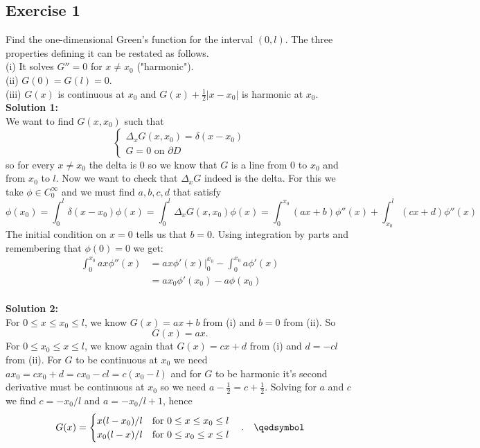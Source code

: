 \documentclass[12pt]{article}%
\begin{document}
\subsection*{Exercise 1}
Find the one-dimensional Green's function for the interval $(0,l)$. The three
properties defining it can be restated as follows.\\
(i) It solves $G''=0$ for $x\neq x_0$ ("harmonic").\\
(ii) $G(0)=G(l)=0$.\\
(iii) $G(x)$ is continuous at $x_0$ and $G(x)+\frac{1}{2}|x-x_0|$ is harmonic at $x_0$.\\
\textbf{Solution 1:}\\
We want to find $G(x,x_0)$ such that
\[
    \begin{cases}
       \Delta_x G(x,x_0)=\delta(x-x_0)\\
       G=0 \text{ on } \partial D
    \end{cases}
\]
so for every $x\neq x_0$ the delta is 0 so we know that $G$ is a line from 0 to
$x_0$ and from $x_0$ to $l$. Now we want to check that $\Delta_x G$ indeed is the
delta. For this we take $\phi \in C_0^\infty$ and we must find $a,b,c,d$ that
satisfy
\[
    \phi(x_0)=\int_0^l \delta(x-x_0)\phi(x)=\int_0^l \Delta_xG(x,x_0)\phi(x) =\int_0^{x_0}(ax+b)\phi''(x) + \int_{x_0}^l(cx+d)\phi''(x)
\]
The initial condition on $x=0$ tells us that $b=0$.
Using integration by parts and remembering that $\phi(0)=0$ we get:
\begin{align*}
    \int_0^{x_0} ax\phi''(x) &= ax\phi'(x)\bigg|_0^{x_0} - \int_0^{x_0}a\phi'(x)\\
    &= ax_0\phi'(x_0) - a\phi(x_0)
\end{align*}
\\\textbf{Solution 2:}\\
For $0\leq x \leq x_0\leq l$, we know $G(x)=ax+b$ from (i) and $b=0$ from (ii). So
\[
G(x)=ax.
\]
For $0\leq x_0\leq x\leq l$, we know again that $G(x)=cx+d$ from
(i) and $d=-cl$ from (ii). For $G$ to be continuous at $x_0$ we
need $ax_0=cx_0+d=cx_0-cl=c(x_0-l)$ and for $G$ to be harmonic it's second
derivative must be continuous at $x_0$ so we need
$a-\frac{1}{2}=c+\frac{1}{2}$. Solving for $a$ and $c$ we find $c=-x_0/l$ and
$a=-x_0/l+1$, hence
\[
    G(x) =\begin{cases}
        x(l-x_0)/l \quad \text{for } 0\leq x\leq x_0 \leq l\\
        x_0(l-x)/l \quad \text{for } 0\leq x_0\leq x \leq l
    \end{cases}. \quad \qedsymbol
\]
\end{document}
